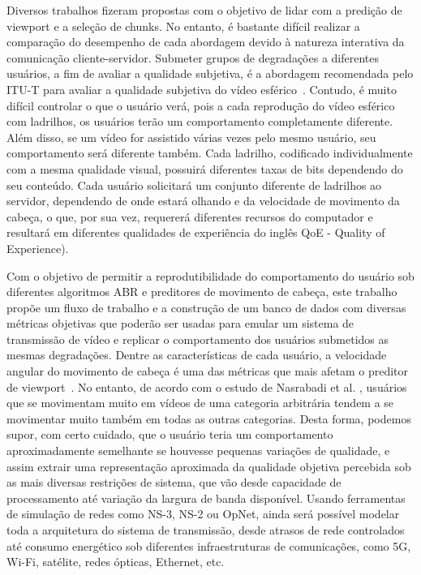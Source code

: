 Diversos trabalhos fizeram propostas com o objetivo de lidar com a predição de viewport e a seleção de chunks. No entanto, é bastante difícil realizar a comparação do desempenho de cada abordagem devido à natureza interativa da comunicação cliente-servidor. Submeter grupos de degradações a diferentes usuários, a fim de avaliar a qualidade subjetiva, é a abordagem recomendada pelo ITU-T para avaliar a qualidade subjetiva do vídeo esférico~\cite{ITU-T2018}. Contudo, é muito difícil controlar o que o usuário verá, pois a cada reprodução do vídeo esférico com ladrilhos, os usuários terão um comportamento completamente diferente. Além disso, se um vídeo for assistido várias vezes pelo mesmo usuário, seu comportamento será diferente também. Cada ladrilho, codificado individualmente com a mesma qualidade visual, possuirá diferentes taxas de bits dependendo do seu conteúdo. Cada usuário solicitará um conjunto diferente de ladrilhos ao servidor, dependendo de onde estará olhando e da velocidade de movimento da cabeça, o que, por sua vez, requererá diferentes recursos do computador e resultará em diferentes qualidades de experiência do inglês QoE - Quality of Experience).

Com o objetivo de permitir a reprodutibilidade do comportamento do usuário sob diferentes algoritmos ABR e preditores de movimento de cabeça, este trabalho propõe um fluxo de trabalho e a construção de um banco de dados com diversas métricas objetivas que poderão ser usadas para emular um sistema de transmissão de vídeo e replicar o comportamento dos usuários submetidos as mesmas degradações. Dentre as características de cada usuário, a velocidade angular do movimento de cabeça é uma das métricas que mais afetam o preditor de viewport~\cite{Qian2016}. No entanto, de acordo com o estudo de Nasrabadi et al. \cite{Nasrabadi2019}, usuários que se movimentam muito em vídeos de uma categoria arbitrária tendem a se movimentar muito também em todas as outras categorias. Desta forma, podemos supor, com certo cuidado, que o usuário teria um comportamento aproximadamente semelhante se houvesse pequenas variações de qualidade, e assim extrair uma representação aproximada da qualidade objetiva percebida sob as mais diversas restrições de sistema, que vão desde capacidade de processamento até variação da largura de banda disponível. Usando ferramentas de simulação de redes como NS-3, NS-2 ou OpNet, ainda será possível modelar toda a arquitetura do sistema de transmissão, desde atrasos de rede controlados até consumo energético sob diferentes infraestruturas de comunicações, como 5G, Wi-Fi, satélite, redes ópticas, Ethernet, etc.

